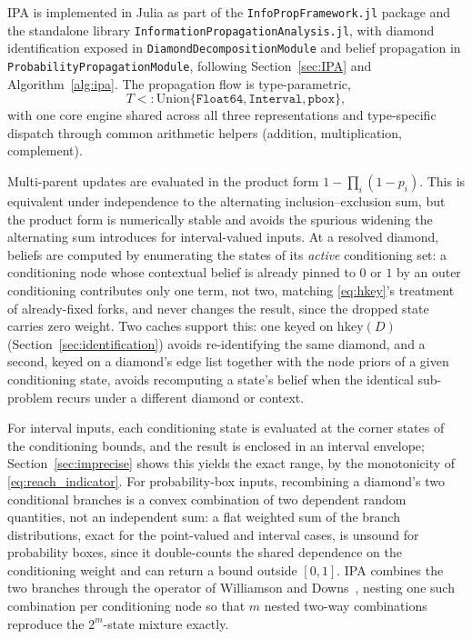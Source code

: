 \documentclass[preprint,12pt]{elsarticle}
\begin{document}
IPA is implemented in Julia as part of the \texttt{InfoPropFramework.jl} package and the standalone library \texttt{InformationPropagationAnalysis.jl}, with diamond identification exposed in \texttt{DiamondDecompositionModule} and belief propagation in \texttt{ProbabilityPropagationModule}, following Section~\ref{sec:IPA} and Algorithm~\ref{alg:ipa}. The propagation flow is type-parametric,
\[
T <: \mathrm{Union}\{\texttt{Float64}, \texttt{Interval}, \texttt{pbox}\},
\]
with one core engine shared across all three representations and type-specific dispatch through common arithmetic helpers (addition, multiplication, complement).

Multi-parent updates are evaluated in the product form $1-\prod_i(1-p_i)$. This is equivalent under independence to the alternating inclusion--exclusion sum, but the product form is numerically stable and avoids the spurious widening the alternating sum introduces for interval-valued inputs. At a resolved diamond, beliefs are computed by enumerating the states of its \emph{active} conditioning set: a conditioning node whose contextual belief is already pinned to $0$ or $1$ by an outer conditioning contributes only one term, not two, matching \eqref{eq:hkey}'s treatment of already-fixed forks, and never changes the result, since the dropped state carries zero weight. Two caches support this: one keyed on $\mathrm{hkey}(D)$ (Section~\ref{sec:identification}) avoids re-identifying the same diamond, and a second, keyed on a diamond's edge list together with the node priors of a given conditioning state, avoids recomputing a state's belief when the identical sub-problem recurs under a different diamond or context.

For interval inputs, each conditioning state is evaluated at the corner states of the conditioning bounds, and the result is enclosed in an interval envelope; Section~\ref{sec:imprecise} shows this yields the exact range, by the monotonicity of \eqref{eq:reach_indicator}. For probability-box inputs, recombining a diamond's two conditional branches is a convex combination of two dependent random quantities, not an independent sum: a flat weighted sum of the branch distributions, exact for the point-valued and interval cases, is unsound for probability boxes, since it double-counts the shared dependence on the conditioning weight and can return a bound outside $[0,1]$. IPA combines the two branches through the operator of Williamson and Downs~\cite{williamson_probabilistic_1990}, nesting one such combination per conditioning node so that $m$ nested two-way combinations reproduce the $2^m$-state mixture exactly.
\end{document}
